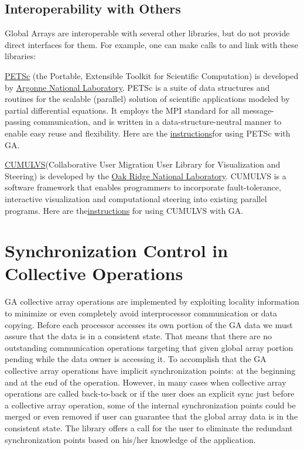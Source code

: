 \subsection{Interoperability with Others }

Global Arrays are interoperable with several other libraries, but
do not provide direct interfaces for them. For example, one can make
calls to and link with these libraries:

\href{http://www.mcs.anl.gov/petsc/petsc-as/}{PETSc} (the Portable,
Extensible Toolkit for Scientific Computation) is developed by \href{http://www.anl.gov/}{Argonne National Laboratory}.
PETSc is a suite of data structures and routines for the scalable
(parallel) solution of scientific applications modeled by partial
differential equations. It employs the MPI standard for all message-passing
communication, and is written in a data-structure-neutral manner to
enable easy reuse and flexibility. Here are the \href{http://www.emsl.pnl.gov/docs/global/petsc.html}{instructions}for
using PETSc with GA. 

\href{http://www.csm.ornl.gov/cs/cumulvs.html}{CUMULVS}(Collaborative
User Migration User Library for Visualization and Steering) is developed
by the \href{http://www.ornl.gov/}{Oak Ridge National Laboratory}.
CUMULVS is a software framework that enables programmers to incorporate
fault-tolerance, interactive visualization and computational steering
into existing parallel programs. Here are the\href{http://www.emsl.pnl.gov/docs/global/cumulvs.html}{instructions}
for using CUMULVS with GA. 


\section{Synchronization Control in Collective Operations }

GA collective array operations are implemented by exploiting locality
information to minimize or even completely avoid interprocessor communication
or data copying. Before each processor accesses its own portion of
the GA data we must assure that the data is in a consistent state.
That means that there are no outstanding communication operations
targeting that given global array portion pending while the data owner
is accessing it. To accomplish that the GA collective array operations
have implicit synchronization points: at the beginning and at the
end of the operation. However, in many cases when collective array
operations are called back-to-back or if the user does an explicit
sync just before a collective array operation, some of the internal
synchronization points could be merged or even removed if user can
guarantee that the global array data is in the consistent state. The
library offers a call for the user to eliminate the redundant synchronization
points based on his/her knowledge of the application.

